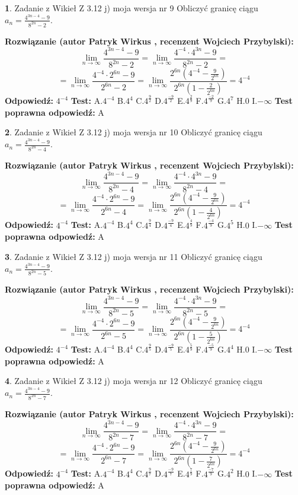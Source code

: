 \documentclass[12pt, a4paper]{article}
\theoremstyle{definition} %
\newtheorem{zad}{}
\newcommand{\zadStart}[1]{\begin{zad}#1\newline}
\newcommand{\zadStop}{\end{zad}}
\newcommand{\rozwStart}[2]{\noindent \textbf{Rozwiązanie (autor #1 , recenzent #2): }\newline}
\newcommand{\rozwStop}{\newline}
\newcommand{\odpStart}{\noindent \textbf{Odpowiedź:}\newline}
\newcommand{\odpStop}{\newline}
\newcommand{\testStart}{\noindent \textbf{Test:}\newline}
\newcommand{\testStop}{\newline}
\newcommand{\kluczStart}{\noindent \textbf{Test poprawna odpowiedź:}\newline}
\newcommand{\kluczStop}{\newline}
\begin{document}
\zadStart{Zadanie z Wikieł Z 3.12 j) moja wersja nr 9}
Obliczyć granicę ciągu $a_{n}=\frac{4^{3n-4}-9}{8^{2n}-2}$.
\zadStop
\rozwStart{Patryk Wirkus}{Wojciech Przybylski}
$$\lim\limits_{n\to\infty}\frac{4^{3n-4}-9}{8^{2n}-2}= \lim\limits_{n\to\infty}\frac{4^{-4} \cdot 4^{3n}-9}{8^{2n}-2}=$$
$$= \lim\limits_{n\to\infty}\frac{4^{-4} \cdot 2^{6n}-9}{2^{6n}-2}= \lim\limits_{n\to\infty}\frac{2^{6n}(4^{-4} - \frac{9}{2^{6n}})}{2^{6n}(1-\frac{2}{2^{6n}})}= 4^{-4}$$
\rozwStop
\odpStart
$4^{-4}$
\odpStop
\testStart
A.$4^{-4}$
B.$4^{4}$
C.$4^{\frac{9}{2}}$
D.$4^{\frac{-9}{2}}$
E.$4^{\frac{2}{9}}$
F.$4^{\frac{-2}{9}}$
G.$4^{7}$
H.$0$
I.$-\infty$
\testStop
\kluczStart
A
\kluczStop



\zadStart{Zadanie z Wikieł Z 3.12 j) moja wersja nr 10}
Obliczyć granicę ciągu $a_{n}=\frac{4^{3n-4}-9}{8^{2n}-4}$.
\zadStop
\rozwStart{Patryk Wirkus}{Wojciech Przybylski}
$$\lim\limits_{n\to\infty}\frac{4^{3n-4}-9}{8^{2n}-4}= \lim\limits_{n\to\infty}\frac{4^{-4} \cdot 4^{3n}-9}{8^{2n}-4}=$$
$$= \lim\limits_{n\to\infty}\frac{4^{-4} \cdot 2^{6n}-9}{2^{6n}-4}= \lim\limits_{n\to\infty}\frac{2^{6n}(4^{-4} - \frac{9}{2^{6n}})}{2^{6n}(1-\frac{4}{2^{6n}})}= 4^{-4}$$
\rozwStop
\odpStart
$4^{-4}$
\odpStop
\testStart
A.$4^{-4}$
B.$4^{4}$
C.$4^{\frac{9}{4}}$
D.$4^{\frac{-9}{4}}$
E.$4^{\frac{4}{9}}$
F.$4^{\frac{-4}{9}}$
G.$4^{5}$
H.$0$
I.$-\infty$
\testStop
\kluczStart
A
\kluczStop



\zadStart{Zadanie z Wikieł Z 3.12 j) moja wersja nr 11}
Obliczyć granicę ciągu $a_{n}=\frac{4^{3n-4}-9}{8^{2n}-5}$.
\zadStop
\rozwStart{Patryk Wirkus}{Wojciech Przybylski}
$$\lim\limits_{n\to\infty}\frac{4^{3n-4}-9}{8^{2n}-5}= \lim\limits_{n\to\infty}\frac{4^{-4} \cdot 4^{3n}-9}{8^{2n}-5}=$$
$$= \lim\limits_{n\to\infty}\frac{4^{-4} \cdot 2^{6n}-9}{2^{6n}-5}= \lim\limits_{n\to\infty}\frac{2^{6n}(4^{-4} - \frac{9}{2^{6n}})}{2^{6n}(1-\frac{5}{2^{6n}})}= 4^{-4}$$
\rozwStop
\odpStart
$4^{-4}$
\odpStop
\testStart
A.$4^{-4}$
B.$4^{4}$
C.$4^{\frac{9}{5}}$
D.$4^{\frac{-9}{5}}$
E.$4^{\frac{5}{9}}$
F.$4^{\frac{-5}{9}}$
G.$4^{4}$
H.$0$
I.$-\infty$
\testStop
\kluczStart
A
\kluczStop



\zadStart{Zadanie z Wikieł Z 3.12 j) moja wersja nr 12}
Obliczyć granicę ciągu $a_{n}=\frac{4^{3n-4}-9}{8^{2n}-7}$.
\zadStop
\rozwStart{Patryk Wirkus}{Wojciech Przybylski}
$$\lim\limits_{n\to\infty}\frac{4^{3n-4}-9}{8^{2n}-7}= \lim\limits_{n\to\infty}\frac{4^{-4} \cdot 4^{3n}-9}{8^{2n}-7}=$$
$$= \lim\limits_{n\to\infty}\frac{4^{-4} \cdot 2^{6n}-9}{2^{6n}-7}= \lim\limits_{n\to\infty}\frac{2^{6n}(4^{-4} - \frac{9}{2^{6n}})}{2^{6n}(1-\frac{7}{2^{6n}})}= 4^{-4}$$
\rozwStop
\odpStart
$4^{-4}$
\odpStop
\testStart
A.$4^{-4}$
B.$4^{4}$
C.$4^{\frac{9}{7}}$
D.$4^{\frac{-9}{7}}$
E.$4^{\frac{7}{9}}$
F.$4^{\frac{-7}{9}}$
G.$4^{2}$
H.$0$
I.$-\infty$
\testStop
\kluczStart
A
\kluczStop
\end{document}
